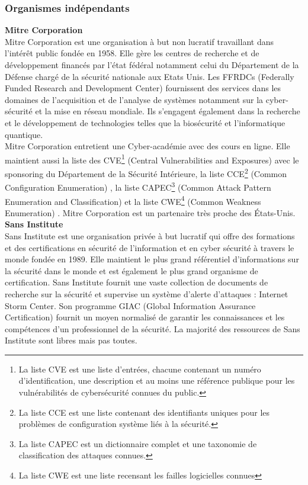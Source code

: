 \subsubsection{Organismes indépendants}
\textbf{\RIGHTarrow Mitre Corporation}\\
Mitre Corporation est une organisation à but non lucratif travaillant dans l’intérêt public fondée en 1958. Elle gère les centres de recherche et de développement financés par l’état fédéral notamment celui du Département de la Défense chargé de la sécurité nationale aux Etats Unis. Les FFRDCs (Federally Funded Research and Development Center)  fournissent des services dans les domaines de l'acquisition et de l'analyse de systèmes notamment sur la cyber-sécurité et la mise en réseau mondiale. Ils s'engagent également dans la recherche et le développement de technologies telles que la biosécurité et l'informatique quantique.\\
Mitre Corporation entretient une Cyber-académie avec des cours en ligne. Elle maintient aussi la liste des CVE\footnote{La liste CVE est une liste d’entrées, chacune contenant un numéro d’identification, une description et au moins une référence publique pour les vulnérabilités de cybersécurité connues du public.} (Central Vulnerabilities and Exposures)  avec le sponsoring du Département de la Sécurité Intérieure, la liste CCE\footnote{La liste CCE est une liste contenant des identifiants uniques pour les problèmes de configuration système liés à la sécurité.} (Common Configuration Enumeration) , la liste CAPEC\footnote{La liste CAPEC est un dictionnaire complet et une taxonomie de classification des attaques connues.} (Common Attack Pattern Enumeration and Classification)  et la liste CWE\footnote{La liste CWE est une liste recensant les failles logicielles connues} (Common Weakness Enumeration) . Mitre Corporation est un partenaire très proche des États-Unis.\\

\textbf{\RIGHTarrow Sans Institute}\\
Sans Institute est une organisation privée à but lucratif qui offre des formations et des certifications en sécurité de l'information et en cyber sécurité à travers le monde fondée en 1989. Elle maintient le plus grand référentiel d'informations sur la sécurité dans le monde et est également le plus grand organisme de certification. Sans Institute fournit une vaste collection de documents de recherche sur la sécurité et supervise un système d’alerte d’attaques : Internet Storm Center. Son programme GIAC (Global Information Assurance Certification)  fournit un moyen normalisé de garantir les connaissances et les compétences d'un professionnel de la sécurité. La majorité des ressources de Sans Institute sont libres mais pas toutes.\\

